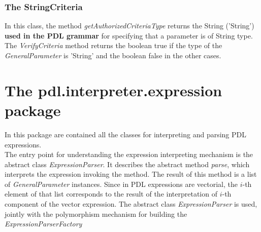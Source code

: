 \documentclass[a4paper,11pt] {ivoa}
\begin{document}
\subsubsection{The StringCriteria}
In this class, the method {\it getAuthorizedCriteriaType} returns the String ('String') {\bf used in the PDL grammar} for specifying that a parameter is of String type.\\
The {\it VerifyCriteria} method returns the boolean true if the type of the {\it GeneralParameter} is 'String' and the boolean false in the other cases.

\section{The pdl.interpreter.expression package}\label{pdl.interpreter.expression}
In this package are contained all the classes for interpreting and parsing PDL expressions.\\
The entry point for understanding the expression interpreting mechanism is the abstract class {\it ExpressionParser}. 
It describes the abstract method {\it parse}, which interprets the expression invoking the method. The result of this method is a list of {\it GeneralParameter} instances. Since in PDL expressions are vectorial, the $i$-th element of that list corresponds to the result of the interpretation of $i$-th component of the vector expression.
The abstract class {\it ExpressionParser} is used, jointly with the polymorphism mechanism for building the {\it ExpressionParserFactory}
\end{document}
